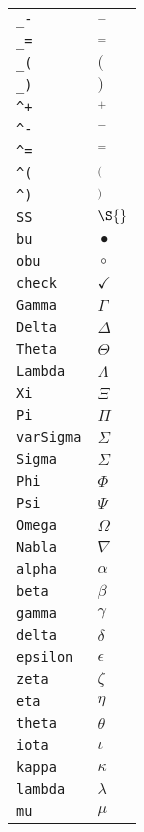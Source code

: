 \begin{longtable}{ll}
\texttt{\_{-}}&${}_- {}$\\
\texttt{\_=}&${}_= {}$\\
\texttt{\_(}&${}( {}$\\
\texttt{\_)}&${}) {}$\\
\texttt{\textasciicircum +}&${}^+ {}$\\
\texttt{\textasciicircum {-}}&${}^- {}$\\
\texttt{\textasciicircum =}&${}^= {}$\\
\texttt{\textasciicircum (}&${}^( {}$\\
\texttt{\textasciicircum )}&${}^) {}$\\
\texttt{SS}&${}\S {}$\\
\texttt{bu}&${}\bullet {}$\\
\texttt{obu}&${}\circ {}$\\
\texttt{check}&${}\checkmark {}$\\
\texttt{Gamma}&${}\Gamma {}$\\
\texttt{Delta}&${}\Delta {}$\\
\texttt{Theta}&${}\Theta {}$\\
\texttt{Lambda}&${}\Lambda {}$\\
\texttt{Xi}&${}\Xi {}$\\
\texttt{Pi}&${}\Pi {}$\\
\texttt{varSigma}&${}\varSigma {}$\\
\texttt{Sigma}&${}\Sigma {}$\\
\texttt{Phi}&${}\Phi {}$\\
\texttt{Psi}&${}\Psi {}$\\
\texttt{Omega}&${}\Omega {}$\\
\texttt{Nabla}&${}\nabla {}$\\
\texttt{alpha}&${}\alpha {}$\\
\texttt{beta}&${}\beta {}$\\
\texttt{gamma}&${}\gamma {}$\\
\texttt{delta}&${}\delta {}$\\
\texttt{epsilon}&${}\epsilon {}$\\
\texttt{zeta}&${}\zeta {}$\\
\texttt{eta}&${}\eta {}$\\
\texttt{theta}&${}\theta {}$\\
\texttt{iota}&${}\iota {}$\\
\texttt{kappa}&${}\kappa {}$\\
\texttt{lambda}&${}\lambda {}$\\
\texttt{mu}&${}\mu {}$\\

\end{longtable}
